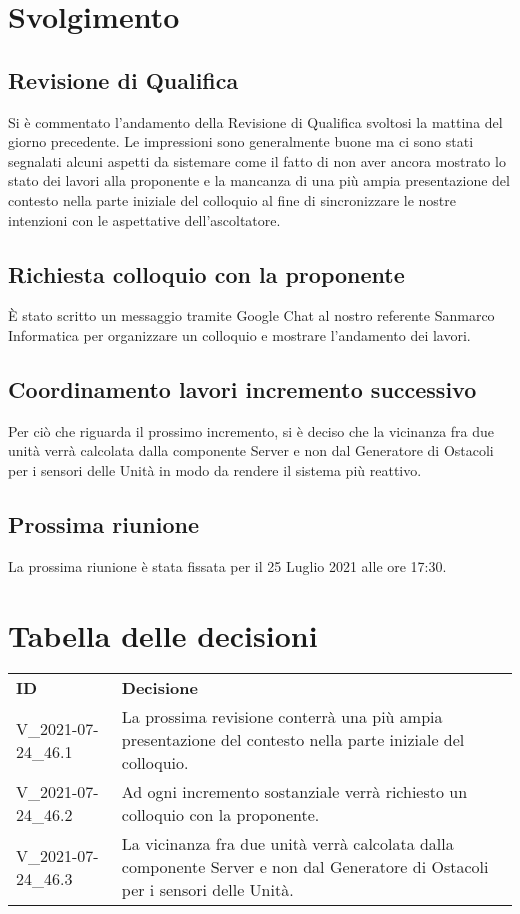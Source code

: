\documentclass[]{article}
\begin{document}
	\newpage

	\section{Svolgimento}
		\subsection{Revisione di Qualifica}
		Si è commentato l'andamento della Revisione di Qualifica svoltosi la mattina del giorno precedente. Le impressioni sono generalmente buone ma ci sono stati segnalati alcuni aspetti da sistemare come il fatto di non aver ancora mostrato lo stato dei lavori alla proponente e la mancanza di una più ampia presentazione del contesto nella parte iniziale del colloquio al fine di sincronizzare le nostre intenzioni con le aspettative dell'ascoltatore.

		\subsection{Richiesta colloquio con la proponente}
		È stato scritto un messaggio tramite Google Chat al nostro referente Sanmarco Informatica per organizzare un colloquio e mostrare l'andamento dei lavori.

        \subsection{Coordinamento lavori incremento successivo}
        Per ciò che riguarda il prossimo incremento, si è deciso che la vicinanza fra due unità verrà calcolata dalla componente Server e non dal Generatore di Ostacoli per i sensori delle Unità in modo da rendere il sistema più reattivo.

		\subsection{Prossima riunione}
		La prossima riunione è stata fissata per il 25 Luglio 2021 alle ore 17:30.

	\section{Tabella delle decisioni}
	\begin{table} [h!]
		\begin{center}
			\begin{tabular} { m{2cm} m{14cm} }
				\rowcolor{lightgray}
				\textbf{ID} & \textbf{Decisione}\\
				V\_2021-07-24\_46.1 & La prossima revisione conterrà una più ampia presentazione del contesto nella parte iniziale del colloquio.\\
                V\_2021-07-24\_46.2 & Ad ogni incremento sostanziale verrà richiesto un colloquio con la proponente.\\
                V\_2021-07-24\_46.3 & La vicinanza fra due unità verrà calcolata dalla componente Server e non dal Generatore di Ostacoli per i sensori delle Unità.
			\end{tabular}
		\end{center}
	\end{table}
\end{document}
